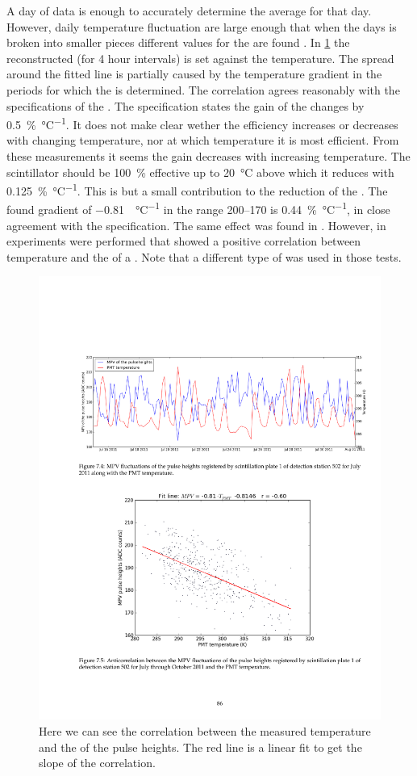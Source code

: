 A day of data is enough to accurately determine the average \mpv for that day. However, daily temperature fluctuation are large enough that when the days is broken into smaller pieces different values for the \mpv are found \cite{bartels2012mpv}. In \cref{fig:mpv_temperature} the reconstructed \mpv (for 4 hour intervals) is set against the \pmt temperature. The spread around the fitted line is partially caused by the temperature gradient in the periods for which the \mpv is determined. The correlation agrees reasonably with the specifications of the \pmt. The specification states the gain of the \pmt changes by \SI{0.5}{\percent\per\degreeCelsius}. It does not make clear wether the efficiency increases or decreases with changing temperature, nor at which temperature it is most efficient. From these measurements it seems the gain decreases with increasing temperature. The scintillator should be \SI{100}{\percent} effective up to \SI{20}{\degreeCelsius} above which it reduces with \SI{0.125}{\percent\per\degreeCelsius}. This is but a small contribution to the reduction of the \mpv. The found gradient of \SI{-0.81}{\adc\per\degreeCelsius} in the range \SIrange{200}{170}{\adc} is \SI{0.44}{\percent\per\degreeCelsius}, in close agreement with the specification. The same effect was found in \cite[Section 3.6]{lio2011}. However, in \cite[Section 3.5]{lio2010} experiments were performed that showed a positive correlation between temperature and the \mpv of a \pmt. Note that a different type of \pmt was used in those tests.

\begin{figure}
    \centering
    \includegraphics[width=0.7\linewidth]{plots/station/mpv_temperature}
    \caption{Here we can see the correlation between the measured temperature and the \mpv of the pulse heights. The red line is a linear fit to get the slope of the correlation.}
    \label{fig:mpv_temperature}
\end{figure}

